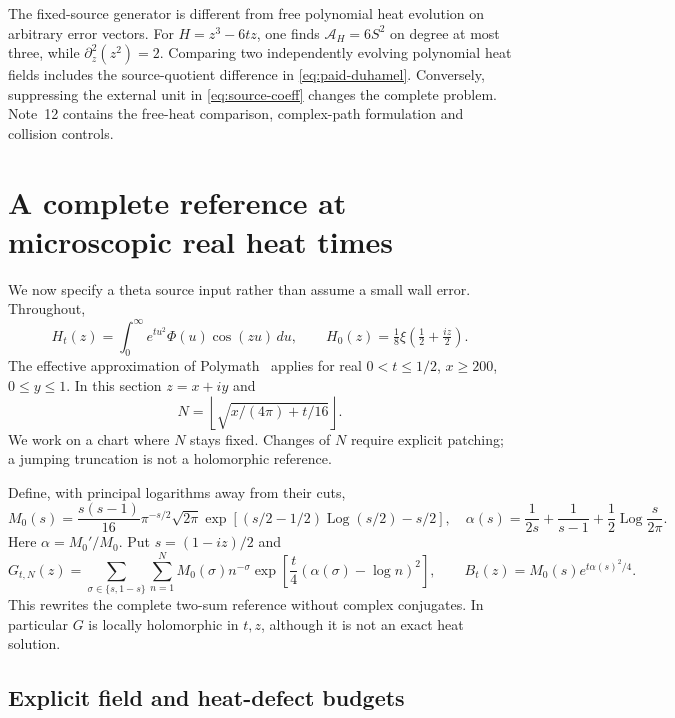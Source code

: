 \begin{remark}
The fixed-source generator is different from free polynomial heat evolution
on arbitrary error vectors. For $H=z^3-6tz$, one finds
$\mathcal A_H=6S^2$ on degree at most three, while
$\partial_z^2(z^2)=2$. Comparing two independently evolving polynomial heat
fields includes the source-quotient difference in
\eqref{eq:paid-duhamel}. Conversely, suppressing the external unit in
\eqref{eq:source-coeff} changes the complete problem. Note~12 contains the
free-heat comparison, complex-path formulation and collision controls.
\end{remark}

\section{A complete reference at microscopic real heat times}
\label{sec:microscopic-reference}

We now specify a theta source input rather than assume a small wall error.
Throughout,
\[
 H_t(z)=\int_0^\infty e^{tu^2}\Phi(u)\cos(zu)\,du,
 \qquad H_0(z)=\tfrac18\xi(\tfrac12+\tfrac{iz}2).
\]
The effective approximation of Polymath~\cite{polymath} applies for real
$0<t\le1/2$, $x\ge200$, $0\le y\le1$. In this section $z=x+iy$ and
\[
 N=\left\lfloor\sqrt{x/(4\pi)+t/16}\right\rfloor.
\]
We work on a chart where $N$ stays fixed. Changes of $N$ require explicit
patching; a jumping truncation is not a holomorphic reference.

Define, with principal logarithms away from their cuts,
\[
 M_0(s)=\frac{s(s-1)}{16}\pi^{-s/2}\sqrt{2\pi}
 \exp\!\left[(s/2-1/2)\operatorname{Log}(s/2)-s/2\right],
\quad
 \alpha(s)=\frac1{2s}+\frac1{s-1}+\frac12\operatorname{Log}\frac{s}{2\pi}.
\]
Here $\alpha=M_0'/M_0$. Put $s=(1-iz)/2$ and
\begin{equation}\label{eq:complete-finite-reference}
 G_{t,N}(z)=\sum_{\sigma\in\{s,1-s\}}\sum_{n=1}^N
 M_0(\sigma)n^{-\sigma}
             \exp\!\left[\frac t4(\alpha(\sigma)-\log n)^2\right],
 \qquad B_t(z)=M_0(s)e^{t\alpha(s)^2/4}.
\end{equation}
This rewrites the complete two-sum reference without complex conjugates.
In particular $G$ is locally holomorphic in $t,z$, although it is not an exact
heat solution.

\subsection{Explicit field and heat-defect budgets}

